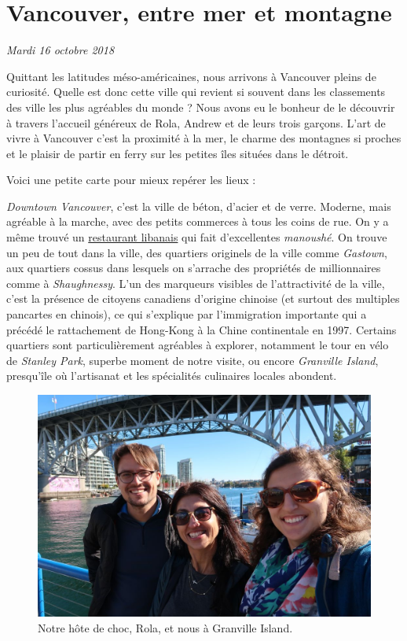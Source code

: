 \hypertarget{vancouver-entre-mer-et-montagne}{%
\section{Vancouver, entre mer et
montagne}\label{vancouver-entre-mer-et-montagne}}

\emph{Mardi 16 octobre 2018}

Quittant les latitudes méso-américaines, nous arrivons à Vancouver
pleins de curiosité. Quelle est donc cette ville qui revient si souvent
dans les classements des ville les plus agréables du monde ? Nous avons
eu le bonheur de le découvrir à travers l'accueil généreux de Rola,
Andrew et de leurs trois garçons. L'art de vivre à Vancouver c'est la
proximité à la mer, le charme des montagnes si proches et le plaisir de
partir en ferry sur les petites îles situées dans le détroit.

Voici une petite carte pour mieux repérer les lieux :

\hypertarget{mapid}{}

\emph{Downtown Vancouver}, c'est la ville de béton, d'acier et de verre.
Moderne, mais agréable à la marche, avec des petits commerces à tous les
coins de rue. On y a même trouvé un
\href{/manger-au-liban.html}{restaurant libanais} qui fait d'excellentes
\emph{manoushé}. On trouve un peu de tout dans la ville, des quartiers
originels de la ville comme \emph{Gastown}, aux quartiers cossus dans
lesquels on s'arrache des propriétés de millionnaires comme à
\emph{Shaughnessy}. L'un des marqueurs visibles de l'attractivité de la
ville, c'est la présence de citoyens canadiens d'origine chinoise (et
surtout des multiples pancartes en chinois), ce qui s'explique par
l'immigration importante qui a précédé le rattachement de Hong-Kong à la
Chine continentale en 1997. Certains quartiers sont particulièrement
agréables à explorer, notamment le tour en vélo de \emph{Stanley Park},
superbe moment de notre visite, ou encore \emph{Granville Island},
presqu'île où l'artisanat et les spécialités culinaires locales
abondent.

\begin{figure}
\centering
\includegraphics{images/20181016_granville.JPG}
\caption{Notre hôte de choc, Rola, et nous à Granville Island.}
\end{figure}

